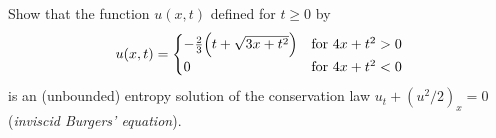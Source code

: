\begin{problem}
  Show that the function \(u(x,t)\) defined for \(t\geq 0\) by
  \[
    u(x,t)=
    \begin{cases}
      -\tfrac{2}{3}\Bigl(t+\sqrt{3x+t^2}\Bigr)
      &\text{for \(4x+t^2>0\)}\\
      0
      &\text{for \(4x+t^2<0\)}
    \end{cases}
  \]
  is an (unbounded) entropy solution of the conservation law
  \(u_t+(u^2/2)_x=0\) (\emph{inviscid Burgers' equation}).
\end{problem}
\begin{solution*}
\end{solution*}

